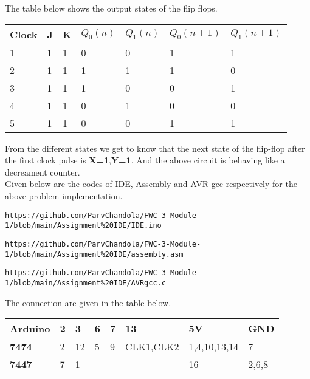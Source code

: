 \documentclass[journal,12pt,twocolumn]{IEEEtran}
\begin{document}
\vspace{3mm}

The table below shows the output states of the flip flops.
\begin{center}
\begin{tabular}{ | m{2em} |m{0.5cm}|m{0.5cm}| m{0.8cm}| m{0.8cm} |m{1.5cm} |m{1.5cm} | } 
  \hline
  \textbf{Clock}& J &K &{$Q_{0}(n)$} & {$Q_{1}(n)$}&{$Q_{0}(n+1)$}&{$Q_{1}(n+1)$} \\ 
  \hline
  1 &1 &1 & 0 & 0& 1& 1 \\ 
  \hline
  2 & 1 &1 &1 & 1& 1& 0 \\ 
  \hline
  3 &1 &1 & 1 & 0 & 0& 1\\
  \hline
  4& 1 &1 &0 & 1 & 0& 0\\
  \hline
  5&1 &1 & 0 & 0 & 1& 1\\
  \hline
\end{tabular}
\end{center}

From the different states we get to know that the next state of the flip-flop after the first clock pulse is 
\textbf{X=1},\textbf{Y=1}. And the above circuit is behaving like a decreament counter.\\

Given below are the codes of IDE, Assembly and AVR-gcc respectively for the above problem implementation.\\

\begin{lstlisting}
https://github.com/ParvChandola/FWC-3-Module-1/blob/main/Assignment%20IDE/IDE.ino
\end{lstlisting}

\begin{lstlisting}
https://github.com/ParvChandola/FWC-3-Module-1/blob/main/Assignment%20IDE/assembly.asm
\end{lstlisting}

\begin{lstlisting}
https://github.com/ParvChandola/FWC-3-Module-1/blob/main/Assignment%20IDE/AVRgcc.c
\end{lstlisting}
The connection are given in the table below.

\newpage

\begin{center}
\begin{tabular}{ | m{5em} | m{1cm}| m{1cm} |m{1cm} |m{1cm} |m{2.5cm} |m{3cm} |m{2cm} | } 
  \hline
  \textbf{Arduino} & 2 & 3& 6& 7& 13& 5V& GND \\ 
  \hline
  \textbf{7474} & 2 & 12 & 5&9 & CLK1,CLK2& 1,4,10,13,14& 7\\ 
  \hline
  \textbf{7447} & 7 & 1 & & & & 16& 2,6,8\\ 
  \hline
\end{tabular}
\end{center}
\end{document}
